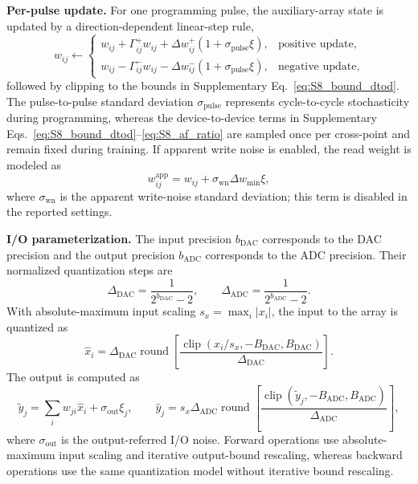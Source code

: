 \documentclass[fleqn,10pt]{wlscirep}
\begin{document}
\noindent\textbf{Per-pulse update.}
For one programming pulse, the auxiliary-array state is updated by a direction-dependent linear-step rule,
\begin{equation}
w_{ij}\leftarrow
\begin{cases}
w_{ij}
+
\Gamma^{+}_{ij}w_{ij}
+
\Delta w^{+}_{ij}\left(1+\sigma_{\mathrm{pulse}}\xi\right),
& \text{positive update},\\[4pt]
w_{ij}
-
\Gamma^{-}_{ij}w_{ij}
-
\Delta w^{-}_{ij}\left(1+\sigma_{\mathrm{pulse}}\xi\right),
& \text{negative update},
\end{cases}
\label{eq:S8_per_pulse_update}
\end{equation}
followed by clipping to the bounds in Supplementary Eq.~\eqref{eq:S8_bound_dtod}. The pulse-to-pulse standard deviation \(\sigma_{\mathrm{pulse}}\) represents cycle-to-cycle stochasticity during programming, whereas the device-to-device terms in Supplementary Eqs.~\eqref{eq:S8_bound_dtod}--\eqref{eq:S8_af_ratio} are sampled once per cross-point and remain fixed during training. If apparent write noise is enabled, the read weight is modeled as
\begin{equation}
w^{\mathrm{app}}_{ij}
=
w_{ij}
+
\sigma_{\mathrm{wn}}\Delta w_{\min}\xi ,
\label{eq:S8_write_noise}
\end{equation}
where \(\sigma_{\mathrm{wn}}\) is the apparent write-noise standard deviation; this term is disabled in the reported settings.

\noindent\textbf{I/O parameterization.}
The input precision \(b_{\mathrm{DAC}}\) corresponds to the DAC precision and the output precision \(b_{\mathrm{ADC}}\) corresponds to the ADC precision. Their normalized quantization steps are
\begin{equation}
\Delta_{\mathrm{DAC}}=\frac{1}{2^{b_{\mathrm{DAC}}}-2},
\qquad
\Delta_{\mathrm{ADC}}=\frac{1}{2^{b_{\mathrm{ADC}}}-2}.
\label{eq:S8_io_resolution}
\end{equation}
With absolute-maximum input scaling \(s_x=\max_i|x_i|\), the input to the array is quantized as
\begin{equation}
\hat{x}_i
=
\Delta_{\mathrm{DAC}}
\operatorname{round}
\left[
\frac{\operatorname{clip}(x_i/s_x,-B_{\mathrm{DAC}},B_{\mathrm{DAC}})}
{\Delta_{\mathrm{DAC}}}
\right].
\label{eq:S8_input_quant}
\end{equation}
The output is computed as
\begin{equation}
\tilde{y}_j
=
\sum_i w_{ji}\hat{x}_i
+
\sigma_{\mathrm{out}}\xi_j,
\qquad
\hat{y}_j
=
s_x\Delta_{\mathrm{ADC}}
\operatorname{round}
\left[
\frac{\operatorname{clip}(\tilde{y}_j,-B_{\mathrm{ADC}},B_{\mathrm{ADC}})}
{\Delta_{\mathrm{ADC}}}
\right],
\label{eq:S8_output_quant}
\end{equation}
where \(\sigma_{\mathrm{out}}\) is the output-referred I/O noise. Forward operations use absolute-maximum input scaling and iterative output-bound rescaling, whereas backward operations use the same quantization model without iterative bound rescaling.
\end{document}

